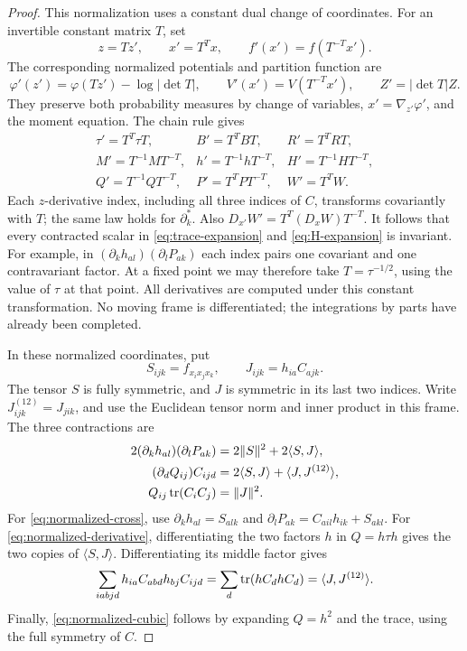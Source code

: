 \begin{proof}
This normalization uses a constant dual change of coordinates.
For an invertible constant matrix $T$, set
\[
 z=Tz',\qquad x'=T^Tx,\qquad
 f'(x')=f(T^{-T}x').
\]
The corresponding normalized potentials and partition function are
\[
 \varphi'(z')=\varphi(Tz')-\log|\det T|,
 \qquad V'(x')=V(T^{-T}x'),
 \qquad Z'=|\det T|Z.
\]
They preserve both probability measures by change of variables,
$x'=\nabla_{z'}\varphi'$, and the moment equation.  The chain rule gives
\[
 \begin{array}{lll}
 \tau'=T^T\tau T,& B'=T^TBT,& R'=T^TRT,\\
 M'=T^{-1}MT^{-T},& h'=T^{-1}hT^{-T},& H'=T^{-1}HT^{-T},\\
 Q'=T^{-1}QT^{-T},& P'=T^TPT^{-T},& W'=T^TW.
 \end{array}
\]
Each $z$-derivative index, including all three indices of $C$,
transforms covariantly with $T$; the same law holds for $\partial_k^*$.
Also $D_{x'}W'=T^T(D_xW)T^{-T}$.
It follows that every contracted scalar in
\eqref{eq:trace-expansion} and \eqref{eq:H-expansion} is invariant.
For example, in
$(\partial_kh_{al})(\partial_lP_{ak})$ each index pairs one
covariant and one contravariant factor.
At a fixed point we may therefore take $T=\tau^{-1/2}$, using
the value of $\tau$ at that point.  All derivatives are computed
under this constant transformation.  No moving frame is
differentiated; the integrations by parts have already been completed.

In these normalized coordinates, put
\[
 S_{ijk}=f_{x_ix_jx_k},\qquad J_{ijk}=h_{ia}C_{ajk}.
\]
The tensor $S$ is fully symmetric, and $J$ is symmetric in its last
two indices.  Write $J^{(12)}_{ijk}=J_{jik}$, and use the Euclidean
tensor norm and inner product in this frame.
The three contractions are
\begin{align}
 2(\partial_kh_{al})(\partial_lP_{ak})
   &=2\|S\|^2+2\langle S,J\rangle,\label{eq:normalized-cross}\\
 (\partial_dQ_{ij})C_{ijd}
   &=2\langle S,J\rangle+\langle J,J^{(12)}\rangle,
       \label{eq:normalized-derivative}\\
 Q_{ij}\operatorname{tr}(C_iC_j)&=\|J\|^2.\label{eq:normalized-cubic}
\end{align}
For \eqref{eq:normalized-cross}, use
$\partial_kh_{al}=S_{alk}$ and
$\partial_lP_{ak}=C_{ail}h_{ik}+S_{akl}$.
For \eqref{eq:normalized-derivative}, differentiating the two factors
$h$ in $Q=h\tau h$ gives the two copies of $\langle S,J\rangle$.
Differentiating its middle factor gives
\[
 \sum_{iabjd}h_{ia}C_{abd}h_{bj}C_{ijd}
 =\sum_d\operatorname{tr}(hC_dhC_d)
 =\langle J,J^{(12)}\rangle.
\]
Finally, \eqref{eq:normalized-cubic} follows by expanding
$Q=h^2$ and the trace, using the full symmetry of $C$.


\end{proof}

